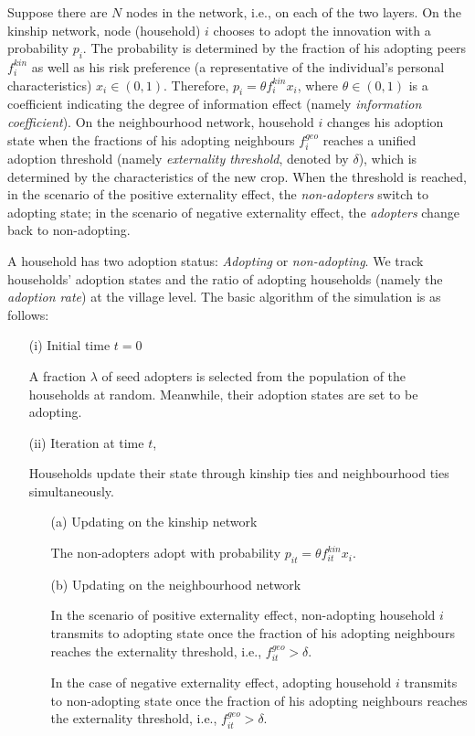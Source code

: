 \documentclass{bmcart}
\begin{document}
Suppose there are $N$ nodes in the network, i.e., on each of the two layers. On the kinship network, node (household) $i$ chooses to adopt the innovation with a probability $p_{i}$. The probability is determined by the fraction of his adopting peers $f_i^{kin}$ as well as his risk preference (a representative of the individual's personal characteristics) $x_{i} \in (0,1)$. Therefore, $p_{i} = \theta f_i^{kin} x_i$, where $\theta \in (0,1)$ is a coefficient indicating the degree of information effect (namely \emph{information coefficient}). On the neighbourhood network, household $i$ changes his adoption state when the fractions of his adopting neighbours $f_i^{geo}$ reaches a unified adoption threshold (namely \emph{externality threshold}, denoted by $\delta$), which is determined by the characteristics of the new crop. When the threshold is reached, in the scenario of the positive externality effect, the \emph{non-adopters} switch to adopting state; in the scenario of negative externality effect, the \emph{adopters} change back to non-adopting. 

A household has two adoption status: \emph{Adopting} or \emph{non-adopting}. We track households' adoption states and the ratio of adopting households (namely the \emph{adoption rate}) at the village level. The basic algorithm of the simulation is as follows:

\begin{enumerate}
\item [(i)] Initial time $t=0$

A fraction $\lambda$ of seed adopters is selected from the population of the households at random. Meanwhile, their adoption states are set to be adopting.

\item [(ii)] Iteration at time $t$, 

Households update their state through kinship ties and neighbourhood ties simultaneously. 
\begin{itemize}
\item [(a)] Updating on the kinship network

The non-adopters adopt with probability $p_{it} = \theta f_{it}^{kin} x_{i}$.

\item [(b)]Updating on the neighbourhood network

In the scenario of positive externality effect, non-adopting household $i$ transmits to adopting state once the fraction of his adopting neighbours reaches the externality threshold, i.e., $f_{it}^{geo} > \delta$. 

In the case of negative externality effect, adopting household $i$ transmits to non-adopting state once the fraction of his adopting neighbours reaches the externality threshold, i.e., $f_{it}^{geo} > \delta$. 
\end{itemize}
\end{enumerate}
\end{document}
